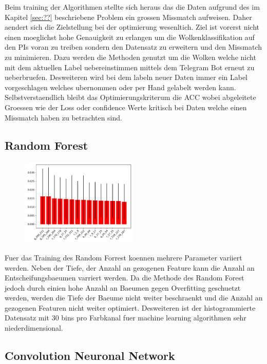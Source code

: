 Beim training der Algorithmen stellte sich heraus das die Daten aufgrund des im
Kapitel \ref{sec:??} beschriebene Problem ein grossen Missmatch aufweisen. 
Daher aendert sich die Zielstellung bei der optimierung wesenltich.
Ziel ist vorerst nicht einen moeglichst hohe Genauigkeit zu erlangen um die
Wolkenklassifikation auf den PIs voran zu treiben sondern den Datensatz zu
erweitern und den Missmatch zu minimieren.
Dazu werden die Methoden genutzt um die Wolken welche nicht mit dem aktuellen
Label uebereinstimmen mittels dem Telegram Bot erneut zu ueberbruefen.
Desweiteren wird bei dem labeln neuer Daten immer ein Label vorgeschlagen
welches ubernommen oder per Hand gelabelt werden kann.
Selbstverstaendlich bleibt das Optimierungskriterum die ACC wobei abgeleitete
Groessen wie der Loss oder confidence Werte kritisch bei Daten welche einen
Missmatch haben zu betrachten sind.

\subsection{Random Forest}%
\label{sub:random_forest}
\begin{figure}
		\centering
		\includegraphics[width=0.5\textwidth]{./pictures/train_rf.pdf}
		\caption{}
		\label{fig:}
\end{figure}
Fuer das Training des Random Forrest koennen mehrere Parameter variiert werden.
Neben der Tiefe, der Anzahl an gezogenen Feature kann die Anzahl an
Entscheifungsbaeumen varriert werden.
Da die Methode des Random Forest jedoch durch einien hohe Anzahl an Baeumen
gegen Overfitting geschuetzt werden, werden die Tiefe der Baeume nicht weiter
beschraenkt und die Anzahl an gezogenen Featuren nicht weiter optimiert.
Desweiteren ist der histogrammierte Datensatz mit 30 bins pro Farbkanal fuer
machine learning algorithmen sehr niederdimensional.

\subsection{Convolution Neuronal Network}%
\label{sub:convolution_neuronal_network}

